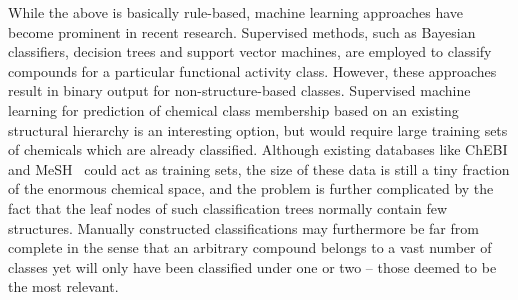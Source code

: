 \documentclass[10pt]{bmc_article}
\newenvironment{bmcformat}{\baselineskip20pt\sloppy\setboolean{publ}{false}}{\baselineskip20pt\sloppy}
\begin{document}
\begin{bmcformat}
While the above is basically rule-based, machine learning approaches have become prominent in recent research. Supervised methods, such as Bayesian classifiers, decision trees and support vector machines, are employed to classify compounds for a particular functional activity class.  However, these approaches result in binary output for non-structure-based classes. Supervised machine learning for prediction of chemical class membership based on an existing structural hierarchy is an interesting option, but would require large training sets of chemicals which are already classified. Although existing databases like ChEBI and MeSH~\cite{meshUrl} could act as training sets, the size of these data is still a tiny fraction of the enormous chemical space, and the problem is further complicated by the fact that the leaf nodes of such classification trees normally contain few structures. Manually constructed classifications may furthermore be far from complete in the sense that an arbitrary compound belongs to a vast number of classes yet will only have been classified under one or two -- those deemed to be the most relevant. 


\end{bmcformat}
\end{document}
